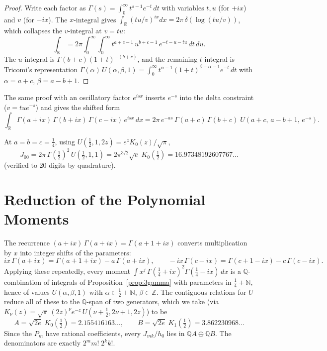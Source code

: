 \documentclass[11pt,a4paper]{article}
\newcommand{\R}{\mathbb{R}}
\newcommand{\Z}{\mathbb{Z}}
\newcommand{\Q}{\mathbb{Q}}
\begin{document}
\begin{proof}
Write each factor as $\Gamma(s) = \int_0^\infty t^{s-1} e^{-t}\, dt$
with variables $t, u$ (for $+ix$) and $v$ (for $-ix$). The $x$-integral
gives $\int_\R (tu/v)^{ix} dx = 2\pi\,\delta(\log(tu/v))$, which
collapses the $v$-integral at $v = tu$:
\[
  \int_\R
  = 2\pi \int_0^\infty\!\!\int_0^\infty
    t^{a+c-1}\, u^{b+c-1}\, e^{-t-u-tu}\, dt\, du.
\]
The $u$-integral is $\Gamma(b+c)(1+t)^{-(b+c)}$, and the remaining
$t$-integral is Tricomi's representation
$\Gamma(\alpha)\, U(\alpha, \beta, 1)
= \int_0^\infty t^{\alpha-1}(1+t)^{\beta-\alpha-1} e^{-t}\, dt$
with $\alpha = a+c$, $\beta = a-b+1$.
\end{proof}

The same proof with an oscillatory factor $e^{isx}$ inserts $e^{-s}$
into the delta constraint ($v = tu e^{-s}$) and gives the shifted form
\begin{equation}\label{eq:shifted}
  \int_\R \Gamma(a+ix)\,\Gamma(b+ix)\,\Gamma(c-ix)\, e^{isx}\, dx
  = 2\pi\, e^{-as}\, \Gamma(a+c)\,\Gamma(b+c)\;
    U(a+c,\, a-b+1,\, e^{-s}).
\end{equation}

At $a = b = c = \tfrac14$, using
$U(\tfrac12, 1, 2z) = e^{z} K_0(z)/\sqrt{\pi}$,
\begin{equation}\label{eq:base}
  J_{00} = 2\pi\, \Gamma(\tfrac12)^2\, U(\tfrac12, 1, 1)
  = 2\pi^{3/2} \sqrt{e}\; K_0(\tfrac12)
  = 16.97348192607767\ldots
\end{equation}
(verified to 20 digits by quadrature).

\section{Reduction of the Polynomial Moments}

The recurrence $(a+ix)\,\Gamma(a+ix) = \Gamma(a+1+ix)$ converts
multiplication by $x$ into integer shifts of the parameters:
\[
  ix\,\Gamma(a+ix) = \Gamma(a+1+ix) - a\,\Gamma(a+ix),
  \qquad
  -ix\,\Gamma(c-ix) = \Gamma(c+1-ix) - c\,\Gamma(c-ix).
\]
Applying these repeatedly, every moment
$\int x^j\, \Gamma(\tfrac14+ix)^2 \Gamma(\tfrac14-ix)\, dx$ is a
$\Q$-combination of integrals of Proposition~\ref{prop:3gamma} with parameters in
$\tfrac14 + \mathbb{N}$, hence of values $U(\alpha, \beta, 1)$ with
$\alpha \in \tfrac12 + \mathbb{N}$, $\beta \in \Z$. The contiguous
relations for $U$ reduce all of these to the $\Q$-span of two
generators, which we take (via
$K_\nu(z) = \sqrt{\pi}\,(2z)^\nu e^{-z}\, U(\nu+\tfrac12, 2\nu+1, 2z)$)
to be
\[
  A = \sqrt{2e}\; K_0(\tfrac12) = 2.155416163\ldots, \qquad
  B = \sqrt{2e}\; K_1(\tfrac12) = 3.862230968\ldots
\]
Since the $P_m$ have rational coefficients, every $J_{mk}/h_0$ lies in
$\Q A \oplus \Q B$. The denominators are exactly $2^m m!\; 2^k k!$.
\end{document}

